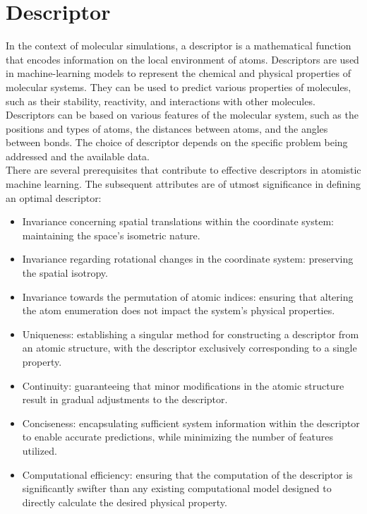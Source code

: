 \section{Descriptor}
In the context of molecular simulations, a descriptor is a mathematical function that encodes information on the local environment of atoms. Descriptors are used in machine-learning models to represent the chemical and physical properties of molecular systems. They can be used to predict various properties of molecules, such as their stability, reactivity, and interactions with other molecules. Descriptors can be based on various features of the molecular system, such as the positions and types of atoms, the distances between atoms, and the angles between bonds. The choice of descriptor depends on the specific problem being addressed and the available data.\\ 
There are several prerequisites that contribute to effective descriptors in atomistic machine learning. The subsequent attributes are of utmost significance in defining an optimal descriptor:
\begin{itemize}
  \item Invariance concerning spatial translations within the coordinate system: maintaining the space's isometric nature.
  \item Invariance regarding rotational changes in the coordinate system: preserving the spatial isotropy.
  \item Invariance towards the permutation of atomic indices: ensuring that altering the atom enumeration does not impact the system's physical properties.

  \item Uniqueness: establishing a singular method for constructing a descriptor from an atomic structure, with the descriptor exclusively corresponding to a single property.

  \item Continuity: guaranteeing that minor modifications in the atomic structure result in gradual adjustments to the descriptor.

  \item Conciseness: encapsulating sufficient system information within the descriptor to enable accurate predictions, while minimizing the number of features utilized.

  \item Computational efficiency: ensuring that the computation of the descriptor is significantly swifter than any existing computational model designed to directly calculate the desired physical property.  

\end{itemize} 

